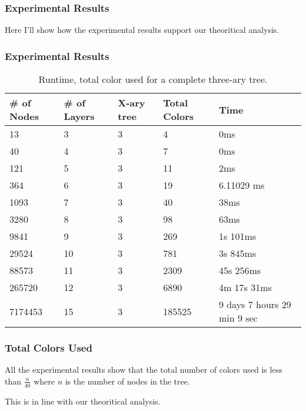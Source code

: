 \begin{frame}
    \frametitle{Experimental Results}
    Here I'll show how the experimental results support our theoritical analysis.
\end{frame}

\begin{frame}
    \frametitle{Experimental Results}

    \begin{table}[h]
        \centering
        \begin{tabular}{|l|l|l|l|l|}
        \hline
        \# of Nodes & \# of Layers & X-ary tree & Total Colors & Time\\
        \hline
        13 & 3 & 3 & 4 & 0ms \\\hline
        40 & 4 & 3 & 7 & 0ms \\\hline
        121 & 5 & 3 & 11 & 2ms \\\hline
        364 & 6 & 3 & 19 & 6.11029 ms \\\hline
        1093 & 7 & 3 & 40 & 38ms \\\hline
        3280 & 8 & 3 & 98 & 63ms \\\hline
        9841 & 9 & 3 & 269 & 1s 101ms \\\hline
        29524 & 10 & 3 & 781 & 3s 845ms \\\hline
        88573 & 11 & 3 & 2309 & 45s 256ms \\\hline
        265720 & 12 & 3 & 6890 & 4m 17s 31ms \\ \hline
        7174453 & 15 & 3 & 185525 & 9 days 7 hours 29 min 9 sec\\
        \hline
        \end{tabular}
        \caption{Runtime, total color used for a complete three-ary tree.}
        \end{table}
\end{frame}

\begin{frame}
    \frametitle{Total Colors Used}

    All the experimental results show that the total number of colors used is less than $\frac{n}{40}$ where $n$ is the number of nodes in the tree. 
    
    \pause[]
    This is in line with our theoritical analysis.

\end{frame}

